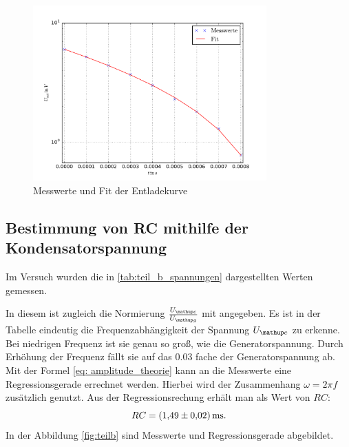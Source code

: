 \begin{figure}
  \centering
  \includegraphics [width=0.8\textwidth]{pics/teil_a_entladung.pdf}
  \caption{Messwerte und Fit der Entladekurve}
  \label{fig:plot_teila}
\end{figure}


\subsection{Bestimmung von RC mithilfe der Kondensatorspannung}
Im Versuch wurden die in \ref{tab:teil_b_spannungen} dargestellten Werten gemessen.



In diesem ist zugleich die Normierung $\frac{U\ua{c}}{U\ua{g}}$ %
mit angegeben.
Es ist in der Tabelle eindeutig die Frequenzabhängigkeit der Spannung $U\ua{c}$ zu erkenne. %
Bei niedrigen Frequenz ist sie genau so groß, wie die Generatorspannung. %
Durch Erhöhung der Frequenz fällt sie auf das $0.03$ fache der Generatorspannung ab. %
Mit der Formel \eqref{eq: amplitude_theorie} kann an die Messwerte eine Regressionsgerade
errechnet werden. Hierbei wird der Zusammenhang $\omega=2\pi f$ zusätzlich genutzt.
Aus der Regressionsrechung erhält man als Wert von $RC$:
\begin{equation}
  \label{eq:rc_teilb}
  RC=\SI{1.49\pm0.02}{\milli\second}.
\end{equation}
In der Abbildung \ref{fig:teilb} sind Messwerte und Regressionsgerade abgebildet. %

